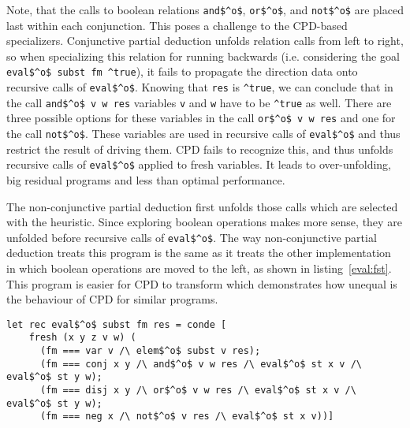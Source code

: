 Note, that the calls to boolean relations \lstinline{and$^o$}, \lstinline{or$^o$}, and \lstinline{not$^o$} are placed last within each conjunction.
This poses a challenge to the CPD-based specializers.
Conjunctive partial deduction unfolds relation calls from left to right, so when specializing this relation for running backwards (i.e. considering the goal \lstinline{eval$^o$ subst fm ^true}), it fails to propagate the direction data onto recursive calls of \lstinline{eval$^o$}.
Knowing that \lstinline{res} is \lstinline{^true}, we can conclude that in the call \lstinline{and$^o$ v w res} variables \lstinline{v} and \lstinline{w} have to be \lstinline{^true} as well.
There are three possible options for these variables in the call \lstinline{or$^o$ v w res} and one for the call \lstinline{not$^o$}.
These variables are used in recursive calls of \lstinline{eval$^o$} and thus restrict the result of driving them.
CPD fails to recognize this, and thus unfolds recursive calls of \lstinline{eval$^o$} applied to fresh variables.
It leads to over-unfolding, big residual programs and less than optimal performance.

The non-conjunctive partial deduction first unfolds those calls which are selected with the heuristic.
Since exploring boolean operations makes more sense, they are unfolded before recursive calls of \lstinline{eval$^o$}.
The way non-conjunctive partial deduction treats this program is the same as it treats the other implementation in which boolean operations are moved to the left, as shown in listing~\ref{eval:fst}.
This program is easier for CPD to transform which demonstrates how unequal is the behaviour of CPD for similar programs.

\begin{figure*}[!h]
  \centering
  \begin{minipage}{0.95\textwidth}
    \begin{lstlisting}[label={eval:fst}, caption={Evaluator of formulas with boolean operation second}, captionpos=b, frame=tb]
  let rec eval$^o$ subst fm res = conde [
    fresh (x y z v w) (
      (fm === var v /\ elem$^o$ subst v res);
      (fm === conj x y /\ and$^o$ v w res /\ eval$^o$ st x v /\ eval$^o$ st y w);
      (fm === disj x y /\ or$^o$ v w res /\ eval$^o$ st x v /\ eval$^o$ st y w);
      (fm === neg x /\ not$^o$ v res /\ eval$^o$ st x v))]
    \end{lstlisting}
  \end{minipage}
\end{figure*}

